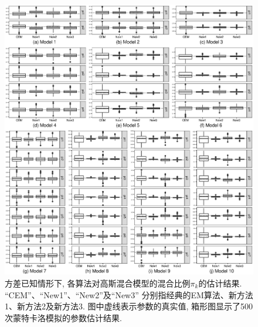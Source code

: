 \documentclass[a4paper,12pt,openany,oneside,utf-8]{ctexbook}
\begin{document}
\begin{figure}[p]
  \centering
  \includegraphics[width = 1\textwidth]{Figure_2_Estimates_for_the_mixing_proportions_for_normal_mixture_models_with_known_sigma.eps}
  \caption{方差已知情形下, 各算法对高斯混合模型的混合比例$\pi_k$的估计结果. ``CEM''、``New1''、``New2''及``New3'' 分别指经典的EM算法、新方法1、新方法2及新方法3. 图中虚线表示参数的真实值, 箱形图显示了500次蒙特卡洛模拟的参数估计结果.}
  \label{fig:Estimates for the mixing proportions for normal mixture models 1-10 with known sigma based on 500 replicates} %
\end{figure}
\end{document}
